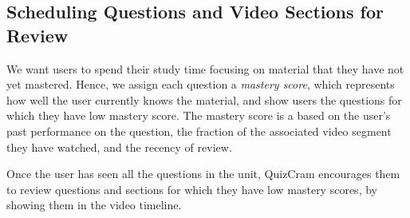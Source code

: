 \documentclass{chi-ext}
\begin{document}
\subsection{Scheduling Questions and Video Sections for Review}


We want users to spend their study time focusing on material that they have not yet mastered. Hence, we assign each question a \emph{mastery score}, which represents how well the user currently knows the material, and show users the questions for which they have low mastery score. The mastery score is a based on the user's past performance on the question, the fraction of the associated video segment they have watched, and the recency of review.

Once the user has seen all the questions in the unit, QuizCram encourages them to review questions and sections for which they have low mastery scores, by showing them in the video timeline.

\end{document}
